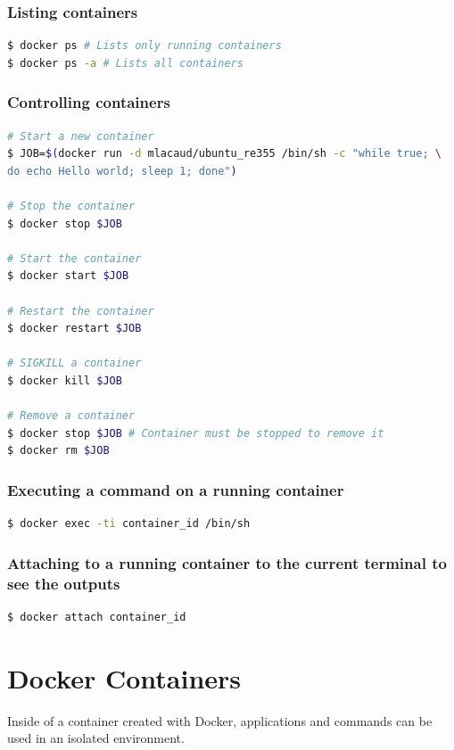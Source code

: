 \documentclass[a4paper,11pt]{exam}
\begin{document}
\subsubsection*{Listing containers}

\begin{lstlisting}[frame=single,language={sh}]
$ docker ps # Lists only running containers
$ docker ps -a # Lists all containers
\end{lstlisting}

\subsubsection*{Controlling containers}
\begin{lstlisting}[frame=single,language={sh}]
# Start a new container
$ JOB=$(docker run -d mlacaud/ubuntu_re355 /bin/sh -c "while true; \
do echo Hello world; sleep 1; done")

# Stop the container
$ docker stop $JOB

# Start the container
$ docker start $JOB

# Restart the container
$ docker restart $JOB

# SIGKILL a container
$ docker kill $JOB

# Remove a container
$ docker stop $JOB # Container must be stopped to remove it
$ docker rm $JOB
\end{lstlisting}

\subsubsection*{Executing a command on a running container}
\begin{lstlisting}[frame=single,language={sh}]
$ docker exec -ti container_id /bin/sh
\end{lstlisting}


\subsubsection*{Attaching to a running container to the current terminal to see the outputs}
\begin{lstlisting}[frame=single,language={sh}]
$ docker attach container_id 
\end{lstlisting}

\section{Docker Containers}
Inside of a container created with Docker, applications and commands can be used in an isolated environment.
\end{document}
